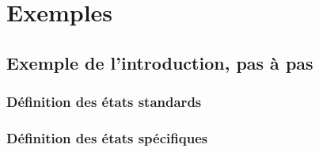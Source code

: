 \documentclass[a4paper,11pt]{report}
\newcommand{\inputTikZ}[1]{%
  }%
\newcommand{\inputTikZ}[1]{%
    \texttt{[image: fig/\#1.pdf]}%
  }%
\begin{document}
\section{Exemples}

\subsection{Exemple de l'introduction, pas à pas}

\subsubsection{Définition des états standards}

\medskip

\begin{center}
\inputTikZ{statediagstep1}
\end{center}

\newpage

{\color{red!70!black}
\vspace{-0.37cm}
\vspace{-0.37cm}
\vspace{-0.37cm}
\vspace{-0.37cm}
\vspace{-0.37cm}

}

\vspace{-0.5cm}

\subsubsection{Définition des états spécifiques}

\medskip

\begin{center}
\inputTikZ{statediagstep2}
\end{center}

\medskip
\end{document}
